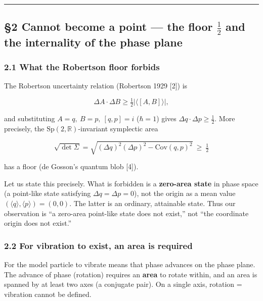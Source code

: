 \documentclass[
]{article}
\begin{document}
\begin{center}\rule{0.5\linewidth}{0.5pt}\end{center}

\subsection{\texorpdfstring{§2 Cannot become a point --- the floor
\(\tfrac12\) and the internality of the phase
plane}{§2 Cannot become a point --- the floor \textbackslash tfrac12 and the internality of the phase plane}}\label{cannot-become-a-point-the-floor-tfrac12-and-the-internality-of-the-phase-plane}

\subsubsection{2.1 What the Robertson floor
forbids}\label{what-the-robertson-floor-forbids}

The Robertson uncertainty relation (Robertson 1929 {[}2{]}) is

\[\Delta A\cdot\Delta B \ge \tfrac12\bigl|\langle[A,B]\rangle\bigr|,\]

and substituting \(A=q,\ B=p,\ [q,p]=i\) (\(\hbar=1\)) gives
\(\Delta q\cdot\Delta p\ge\tfrac12\). More precisely, the
\(\mathrm{Sp}(2,\mathbb{R})\)-invariant symplectic area

\[\sqrt{\det\Sigma}=\sqrt{(\Delta q)^2(\Delta p)^2-\mathrm{Cov}(q,p)^2}\ \ge\ \tfrac12\]

has a floor (de Gosson's quantum blob {[}4{]}).

Let us state this precisely. What is forbidden is a \textbf{zero-area
state} in phase space (a point-like state satisfying
\(\Delta q=\Delta p=0\)), not the origin as a mean value
\((\langle q\rangle,\langle p\rangle)=(0,0)\). The latter is an
ordinary, attainable state. Thus our observation is ``a zero-area
point-like state does not exist,'' not ``the coordinate origin does not
exist.''

\subsubsection{2.2 For vibration to exist, an area is
required}\label{for-vibration-to-exist-an-area-is-required}

For the model particle to vibrate means that phase advances on the phase
plane. The advance of phase (rotation) requires an \textbf{area} to
rotate within, and an area is spanned by at least two axes (a conjugate
pair). On a single axis, rotation = vibration cannot be defined.
\end{document}
